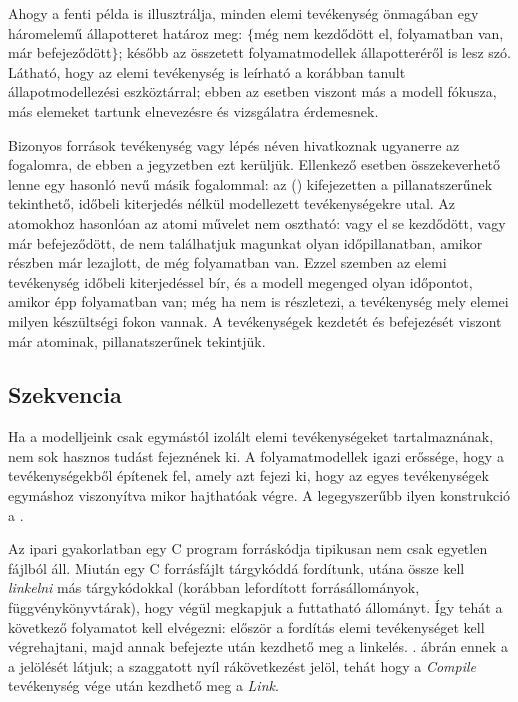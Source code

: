 
Ahogy a fenti példa is illusztrálja, minden elemi tevékenység önmagában egy háromelemű állapotteret határoz meg: $\{$még nem kezdődött el, folyamatban van, már befejeződött$\}$; később az összetett folyamatmodellek állapotteréről is lesz szó. Látható, hogy az elemi tevékenység is leírható a korábban tanult állapotmodellezési eszköztárral; ebben az esetben viszont más a modell fókusza, más elemeket tartunk elnevezésre és vizsgálatra érdemesnek. 

\begin{megjegyzes}
	Bizonyos források  tevékenység vagy lépés néven hivatkoznak ugyanerre az  fogalomra, de ebben a jegyzetben ezt kerüljük. Ellenkező esetben összekeverhető lenne  egy hasonló nevű másik fogalommal: az  () kifejezetten a pillanatszerűnek tekinthető, időbeli kiterjedés nélkül modellezett tevékenységekre utal. Az atomokhoz hasonlóan az atomi művelet nem osztható: vagy el se kezdődött, vagy már befejeződött, de nem találhatjuk magunkat olyan időpillanatban, amikor részben már lezajlott, de még folyamatban van. Ezzel szemben az elemi tevékenység időbeli kiterjedéssel bír, és a modell megenged olyan időpontot, amikor épp folyamatban van; még ha nem is részletezi, a tevékenység mely elemei milyen készültségi fokon vannak. A tevékenységek kezdetét és befejezését viszont már atominak, pillanatszerűnek tekintjük.
\end{megjegyzes}

\subsection{Szekvencia}
Ha a modelljeink csak egymástól izolált elemi tevékenységeket tartalmaznának, nem sok hasznos tudást fejeznének ki. A folyamatmodellek igazi erőssége, hogy a tevékenységekből  építenek fel, amely azt fejezi ki, hogy az egyes tevékenységek egymáshoz viszonyítva mikor hajthatóak végre. A legegyszerűbb ilyen konstrukció a .

\begin{pelda}
Az ipari gyakorlatban egy C program forráskódja tipikusan nem csak egyetlen fájlból áll. Miután egy C forrásfájlt tárgykóddá fordítunk, utána össze kell \emph{linkelni} más tárgykódokkal (korábban lefordított forrásállományok, függvénykönyvtárak), hogy végül megkapjuk a futtatható állományt. Így tehát a következő folyamatot kell elvégezni: először a fordítás elemi tevékenységet kell végrehajtani, majd annak befejezte után kezdhető meg a linkelés. . ábrán ennek a  a jelölését látjuk; a szaggatott nyíl rákövetkezést jelöl, tehát hogy a \emph{Compile} tevékenység vége után kezdhető meg a \emph{Link}.  
\end{pelda}

